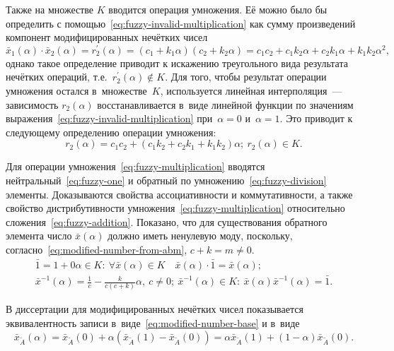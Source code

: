 Также на множестве $K$ вводится операция умножения. Её можно было бы определить с помощью~\eqref{eq:fuzzy-invalid-multiplication} как сумму произведений компонент модифицированных нечётких чисел
\begin{equation}
\label{eq:fuzzy-invalid-multiplication}
  \bar{x}_1(\alpha )\cdot \bar{x}_2(\alpha )=r_{2}^{'}\left( \alpha  \right)=\left( c_1+k_1\alpha  \right)\left( c_2+k_2\alpha \right)= c_1 c_2+c_1 k_2\alpha+c_2 k_1\alpha+k_1 k_2\alpha^2,
\end{equation}
однако такое определение приводит к искажению треугольного вида результата нечётких операций, т.е.~$r_{2}^{'}\left( \alpha  \right)\notin K$. Для того, чтобы результат операции умножения остался в~множестве~$K$, используется линейная интерполяция~--- зависимость $r_2\left(\alpha \right)$ восстанавливается в~виде линейной функции по значениям выражения~\eqref{eq:fuzzy-invalid-multiplication} при~$\alpha =0$ и~$\alpha=1$. Это приводит к следующему определению операции умножения:
\begin{equation}
\label{eq:fuzzy-multiplication}
  r_2\left( \alpha \right)=c_1 c_2+\left(c_1 k_2+ c_2 k_1 +k_1 k_2 \right)\alpha;\ r_2\left( \alpha  \right)\in K.
\end{equation}

Для операции умножения~\eqref{eq:fuzzy-multiplication} вводятся нейтральный~\eqref{eq:fuzzy-one} и обратный по умножению~\eqref{eq:fuzzy-division} элементы. Доказываются свойства ассоциативности и коммутативности, а также свойство дистрибутивности умножения~\eqref{eq:fuzzy-multiplication} относительно сложения~\eqref{eq:fuzzy-addition}. Показано, что для существования обратного элемента число $\bar{x}\left( \alpha  \right)$ должно иметь ненулевую моду, поскольку, согласно~\eqref{eq:modified-number-from-abm}, $c+k=m\ne 0$.
\begin{gather}
  \label{eq:fuzzy-one}
  \bar{1}=1+0\alpha \in K:\ \forall \bar{x}\left( \alpha  \right)\in K\quad \bar{x}\left( \alpha  \right)\cdot \bar{1}=\bar{x}\left( \alpha  \right); \\
  \label{eq:fuzzy-division}
  \bar{x}^{-1}(\alpha )=\frac{1}{c}-\frac{k}{c\left(c+k\right)}\alpha,\ c\ne 0;\ \bar{x}^{-1}(\alpha ) \in K:\ \bar{x}\left(\alpha \right){{\bar{x}}^{-1}}\left( \alpha  \right)=\bar{1}.
\end{gather}

В диссертации для модифицированных нечётких чисел показывается эквивалентность записи в~виде~\eqref{eq:modified-number-base} и в~виде
\begin{equation}
\label{eq:isomorphic-field}
  \bar{x}_{\tilde A}\left( \alpha \right)=\bar{x}_{\tilde A}\left( 0 \right)+\alpha \left(\bar{x}_{\tilde A}\left( 1 \right)-\bar{x}_{\tilde A}\left(0 \right) \right)=\alpha \bar{x}_{\tilde A}\left( 1 \right)+\left( 1-\alpha  \right) \bar{x}_{\tilde A}\left( 0 \right).
\end{equation}

